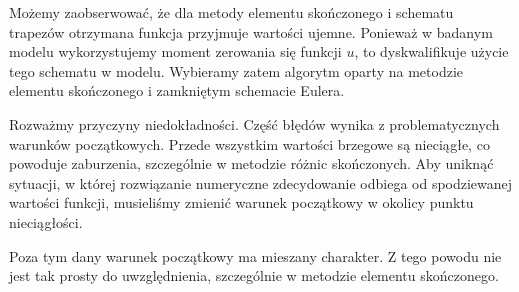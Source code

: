 \documentclass{article}
\begin{document}
Możemy zaobserwować, że dla metody elementu skończonego i schematu trapezów otrzymana funkcja przyjmuje wartości ujemne. Ponieważ w badanym modelu wykorzystujemy moment zerowania się funkcji $u$, to dyskwalifikuje użycie tego schematu w modelu. Wybieramy zatem algorytm oparty na metodzie elementu skończonego i zamkniętym schemacie Eulera.
 
Rozważmy przyczyny niedokładności. Część błędów wynika z problematycznych warunków początkowych. Przede wszystkim wartości brzegowe są nieciągłe, co powoduje zaburzenia, szczególnie w metodzie różnic skończonych. Aby uniknąć sytuacji, w której rozwiązanie numeryczne zdecydowanie odbiega od spodziewanej wartości funkcji, musieliśmy zmienić warunek początkowy w okolicy punktu nieciągłości.

Poza tym dany warunek początkowy ma mieszany charakter. Z tego powodu nie jest tak prosty do uwzględnienia, szczególnie w metodzie elementu skończonego.
\end{document}

